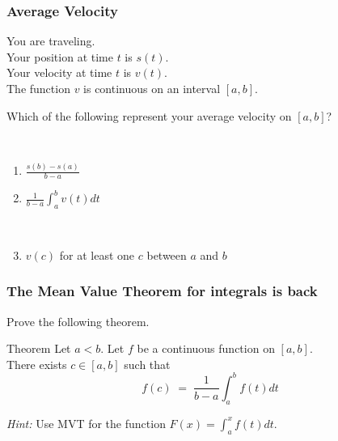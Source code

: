 \documentclass[14pt]{beamer}
\newcommand {\DS} [1] {${\displaystyle #1}$}
\newcommand{\p}{\pause}
\newcommand{\setsize}[1]{\fontsize{#1}{#1}\selectfont} %
\newcommand{\smallerfont}{\setsize{13}} %
\begin{document}
\begin{frame}[t]
\smallerfont
\frametitle{Average Velocity}

You are traveling. \\
Your position at time $t$ is $s(t)$. \\
Your velocity at time $t$ is $v(t)$. \\
The function $v$ is  continuous on an interval $[a,b]$.


Which of the following represent your average velocity on $[a,b]$?

\

\begin{enumerate}
	\item \DS{\frac{s(b) - s(a)}{b-a}}

	\item \DS{\frac{1}{b-a} \int_a^b v(t) dt}

\
	\item $v(c)$ for at least one $c$ between $a$ and $b$
\end{enumerate}


\end{frame}
\begin{frame}[t]
\smallerfont
\frametitle{The Mean Value Theorem for integrals is back}   

Prove the following theorem.

\begin{block}{\smallerfont Theorem}
Let $a < b$. 
Let $f$ be a continuous function on $[a,b]$. \\
There exists $c \in [a,b]$ such that  \vspace{-.5cm}
	$$
		f(c) \; = \; \frac{1}{b-a} \int_a^b f(t) dt
	$$
\end{block}

\p

\emph{Hint:}  Use MVT  for the function \DS{F(x) = \int_a^x f(t) dt}. 

\end{frame}
\end{document}

